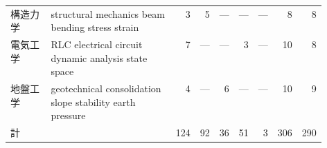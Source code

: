 \begin{footnotesize}
\begin{longtable}{@{}>{\raggedright\arraybackslash}p{0.13\linewidth}>{\raggedright\arraybackslash}p{0.40\linewidth}rrrrrrr@{}}
構造力学 & structural mechanics beam bending stress strain & 3 & 5 & --- & --- & --- & 8 & 8 \\
電気工学 & RLC electrical circuit dynamic analysis state space & 7 & --- & --- & 3 & --- & 10 & 8 \\
地盤工学 & geotechnical consolidation slope stability earth pressure & 4 & --- & 6 & --- & --- & 10 & 9 \\
\midrule
計 & & 124 & 92 & 36 & 51 & 3 & 306 & 290 \\
\end{longtable}
\end{footnotesize}
